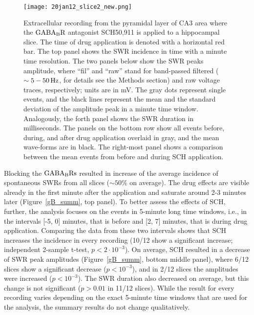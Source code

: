     \begin{figure}
      \center
      \texttt{[image: 20jan12\_slice2\_new.png]}
      \caption{ 
        Extracellular recording from the pyramidal layer of CA3 area where the
        $\rm GABA_B R$ antagonist SCH50,911 is applied to a hippocampal slice.
        The time of drug application is denoted with a horizontal red bar. The
        top panel shows the SWR incidence in time with a minute time resolution.
        The two panels below show the SWR peaks amplitude, where ``fil'' and ``raw''
        stand for band-passed filtered ($\sim 5-50\, \rm Hz$, for details see
        the Methods section) and raw voltage traces, respectively; units are in
        mV. The gray dots represent single events, and the black lines
        represent the mean and the standard deviation of the amplitude peak in
        a minute time window. Analogously, the forth panel shows the SWR
        duration in milliseconds. The panels on the bottom row show all events
        before, during, and after drug application overlaid in gray,
        and the mean wave-forms are in black. The right-most panel shows a
        comparison between the mean events from before and during SCH
        application.
              }
    \label{fig:gB_example}
    \end{figure}

    Blocking the $\rm GABA_B Rs$ resulted in increase of the average incidence
    of spontaneous SWRs from all slices ($\sim 50\%$ on average). The drug
    effects are visible already in the first minute after the application and
    saturate around 2-3 minutes later (Figure~\ref{gB_summ}, top panel). To
    better assess the effects of SCH, further, the analysis focuses on the
    events in 5-minute long time windows, i.e., in the intervals [-5, 0]
    minutes, that is before and [2, 7] minutes, that is during drug
    application. Comparing the data from these two intervals shows that SCH
    increases the incidence in every recording (10/12 show a significant
    increase; independent 2-sample t-test, $p<2 \cdot 10^{-3}$). On average,
    SCH resulted in a decrease of SWR peak amplitudes (Figure~\ref{gB_summ},
    bottom middle panel), where 6/12 slices show a significant decrease
    ($p<10^{-3}$), and in 2/12 slices the amplitudes were increased
    ($p<10^{-3}$). The SWR duration also decreased on average, but this change
    is not significant ($p>0.01$ in 11/12 slices). While the result for every
    recording varies depending on the exact 5-minute time windows that are used
    for the analysis, the summary results do not change qualitatively.
    
